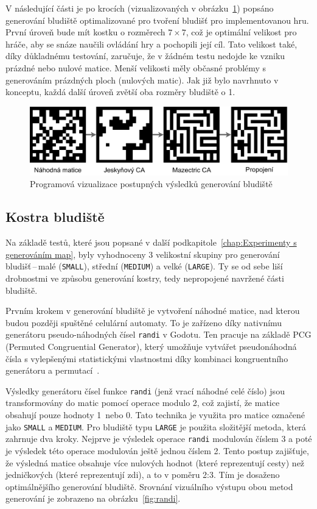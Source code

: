 V následující části je po krocích (vizualizovaných v obrázku~\ref{fig:visualisation_generating}) popsáno generování bludiště optimalizované pro tvoření bludišť pro implementovanou hru. První úroveň bude mít kostku o rozměrech $7 \times 7$, což je optimální velikost pro hráče, aby se snáze naučili ovládání hry a pochopili její cíl. Tato velikost také, díky důkladnému testování, zaručuje, že v žádném testu nedojde ke vzniku prázdné nebo nulové matice. Menší velikosti měly občasné problémy s generováním prázdných ploch (nulových matic). Jak již bylo navrhnuto v konceptu, každá další úroveň zvětší oba rozměry bludiště o 1.

\vspace{0.5cm}
\begin{figure}[b]
    \centering
    \includegraphics[width=\textwidth]{obrazky-figures/ch4/visualisation_generating.pdf}
    \caption{Programová vizualizace postupných výsledků generování bludiště}
    \label{fig:visualisation_generating}
\end{figure}

\subsection*{Kostra bludiště}
Na základě testů, které jsou popsané v další podkapitole~\ref{chap:Experimenty s generováním map}, byly vyhodnoceny 3 velikostní skupiny pro generování bludišť\,--\,malé (\verb|SMALL|), střední (\verb|MEDIUM|) a velké (\verb|LARGE|). Ty se od sebe liší drobnostmi ve způsobu generování kostry, tedy nepropojené navržené části bludiště.

Prvním krokem v generování bludiště je vytvoření náhodné matice, nad kterou budou později spuštěné celulární automaty. To je zařízeno díky nativnímu generátoru pseudo-náhodných čísel \verb|randi| v Godotu. Ten pracuje na základě PCG (Permuted Congruential Generator), který umožňuje vytvářet pseudonáhodná čísla s vylepšenými statistickými vlastnostmi díky kombinaci kongruentního generátoru a permutací~\cite{PCG}. 

Výsledky generátoru čísel funkce \verb|randi| (jenž vrací náhodné celé číslo) jsou transformovány do matic pomocí operace modulo 2, což zajistí, že matice obsahují pouze hodnoty 1~nebo 0. Tato technika je využita pro matice označené jako \verb|SMALL| a \verb|MEDIUM|. Pro bludiště typu \verb|LARGE| je použita složitější metoda, která zahrnuje dva kroky. Nejprve je výsledek operace \verb|randi| modulován číslem 3 a poté je výsledek této operace modulován ještě jednou číslem 2. Tento postup zajišťuje, že výsledná matice obsahuje více nulových hodnot (které reprezentují cesty) než jedničkových (které reprezentují zdi), a to v poměru 2:3. Tím je dosaženo optimálnějšího generování bludiště. Srovnání vizuálního výstupu obou metod generování je zobrazeno na obrázku~\ref{fig:randi}.

